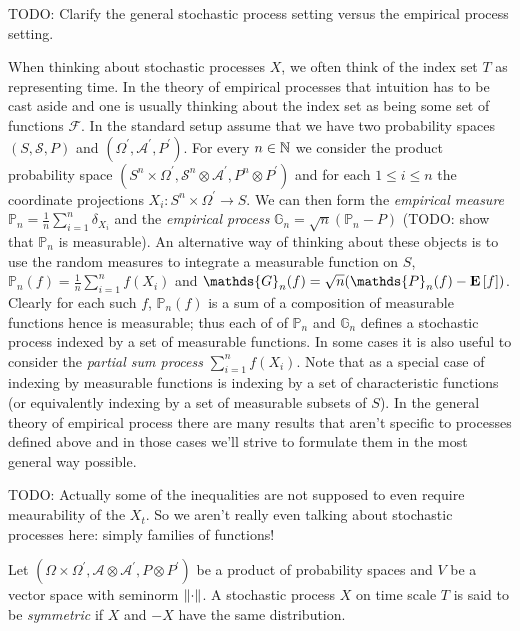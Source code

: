 TODO: Clarify the general stochastic process setting versus the empirical process setting.  

When thinking about stochastic processes $X$, we often think of the index set $T$ as representing time.  In the theory of empirical processes that intuition has to be cast aside and one is usually thinking about the index set as being some set of functions $\mathcal{F}$.  In the standard setup assume that we have two probability spaces $(S, \mathcal{S}, P)$ and $(\Omega^\prime, \mathcal{A}^\prime, P^\prime)$.  For every $n \in \mathbb{N}$ we consider the product probability space
$(S^n \times \Omega^\prime, \mathcal{S}^n \otimes \mathcal{A}^\prime, P^n \otimes P^\prime)$ and for each $1 \leq i \leq n$ the coordinate projections $X_i : S^n \times \Omega^\prime \to S$.  We can then form the \emph{empirical measure} $\mathds{P}_n = \frac{1}{n} \sum_{i=1}^n \delta_{X_i}$ and the \emph{empirical process} 
$\mathds{G}_n = \sqrt{n}( \mathds{P}_n - P)$ (TODO: show that $\mathds{P}_n$ is measurable).  An alternative way of thinking about these objects is to use the random measures to integrate a measurable function on $S$, $\mathds{P}_n(f) = \frac{1}{n} \sum_{i=1}^n f(X_i)$ and $\mathds{G}_n(f) = \sqrt{n}(\mathds{P}_n(f) - \expectation{f})$.  Clearly for each such $f$, $\mathds{P}_n(f)$ is a sum of a composition of measurable functions hence is measurable; thus each of of $\mathds{P}_n$ and $\mathds{G}_n$ defines a stochastic process indexed by a set of measurable functions.  In some cases it is also useful to consider the \emph{partial sum process} $\sum_{i=1}^n f(X_i)$.   Note that as a special case of indexing by measurable functions is indexing by a set of characteristic functions (or equivalently indexing by a set of measurable subsets of $S$).  In the general theory of empirical process there are many results that aren't specific to processes defined above and in those cases we'll strive to formulate them in the most general way possible.

TODO: Actually some of the inequalities are not supposed to even require meaurability of the $X_t$.  So we aren't really even talking about stochastic processes here: simply families of functions!

\begin{defn}Let $(\Omega \times \Omega^\prime, \mathcal{A} \otimes \mathcal{A}^\prime, P \otimes P^\prime)$ be a product of probability spaces and $V$ be a vector space with seminorm $\left \lVert \cdot \right \rVert$.  A stochastic process $X$ on time scale $T$ is said to be \emph{symmetric} if $X$ and $-X$ have the same distribution.
\end{defn}

